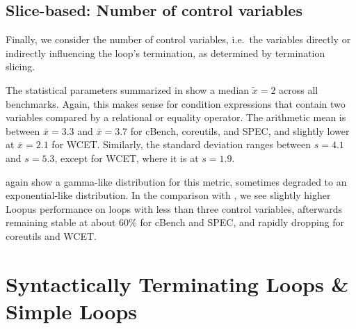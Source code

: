 

    \def \plotcutarrow {->}
    \def \plotcutarrow {-}

\subsection{Slice-based: Number of control variables}

    Finally, we consider the number of control variables, i.e.\ the variables directly or indirectly influencing the loop's termination, as determined by termination slicing.

    The statistical parameters summarized in  show a median $\tilde{x} = 2$ across all benchmarks. Again, this makes sense for condition expressions that contain two variables compared by a relational or equality operator. The arithmetic mean is between $\bar{x} = 3.3$ and $\bar{x} = 3.7$ for cBench, coreutils, and SPEC, and slightly lower at $\bar{x} = 2.1$ for WCET. Similarly, the standard deviation ranges between $s = 4.1$ and $s = 5.3$, except for WCET, where it is at $s = 1.9$.

     again show a gamma-like distribution for this metric, sometimes degraded to an exponential-like distribution. In the comparison with \loopus{}, we see slightly higher Loopus performance on loops with less than three control variables, afterwards remaining stable at about 60\% for cBench and SPEC, and rapidly dropping for coreutils and WCET.



    \def \plotcutarrow {->}
    \def \plotcutarrow {-}

\section{Syntactically Terminating Loops \& Simple Loops}
\label{sec:simpleloopschar}

